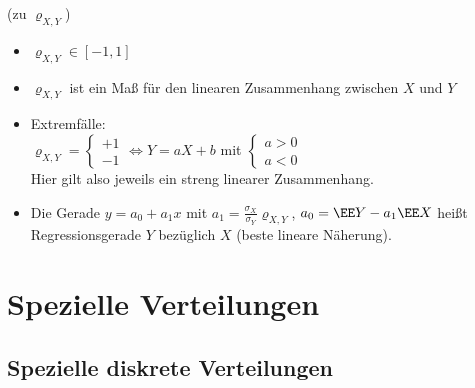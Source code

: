 \documentclass{scrreprt}
\begin{document}
 (zu $\varrho_{X,Y}$)
\begin{itemize}
\item $\varrho_{X,Y} \in [-1,1]$
\item $\varrho_{X,Y}$ ist ein Maß für den linearen Zusammenhang zwischen $X$ und $Y$
\item Extremfälle:\\
$\varrho_{X,Y}=\begin{cases}
+1\\
-1
\end{cases} \Leftrightarrow Y=aX+b$ mit $\begin{cases}
a > 0\\
a < 0
\end{cases}$\\
Hier gilt also jeweils ein streng linearer Zusammenhang.
\item Die Gerade $y=a_0+a_1 x$ mit $a_1 = \frac{\sigma_X}{\sigma_Y}\varrho_{X,Y}$, $a_0=\EE Y - a_1 \EE  X$ heißt Regressionsgerade $Y$ bezüglich $X$ (beste lineare Näherung).
\end{itemize} 

\section{Spezielle Verteilungen}
\subsection{Spezielle diskrete Verteilungen}
\end{document}
